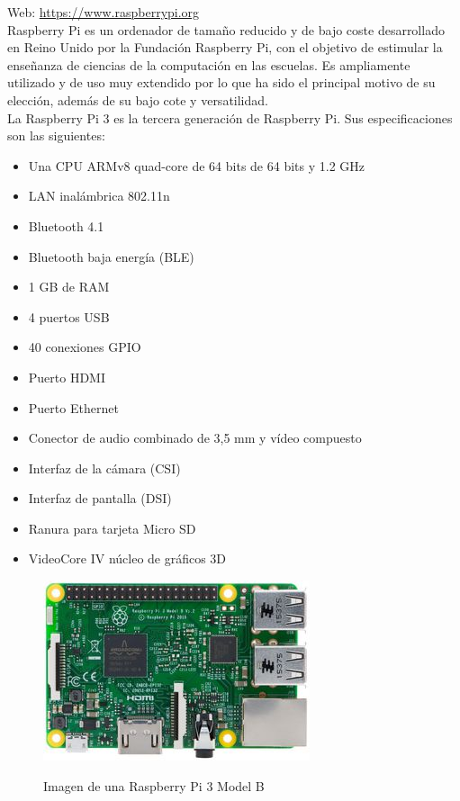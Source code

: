 Web: \url{https://www.raspberrypi.org}\\

Raspberry Pi es un ordenador de tamaño reducido y de bajo coste desarrollado en Reino Unido por la Fundación Raspberry Pi, con el objetivo de estimular la enseñanza de ciencias de la computación
en las escuelas. Es ampliamente utilizado y de uso muy extendido por lo que ha sido el principal motivo de su elección, además de su bajo cote y versatilidad.\\

La Raspberry Pi 3 es la tercera generación de Raspberry Pi. Sus especificaciones son las siguientes:

\begin{itemize}
 \item Una CPU ARMv8 quad-core de 64 bits de 64 bits y 1.2 GHz
 \item LAN inalámbrica 802.11n
 \item Bluetooth 4.1
 \item Bluetooth baja energía (BLE)
 \item 1 GB de RAM
 \item 4 puertos USB
 \item 40 conexiones GPIO
 \item Puerto HDMI
 \item Puerto Ethernet
 \item Conector de audio combinado de 3,5 mm y vídeo compuesto
 \item Interfaz de la cámara (CSI)
 \item Interfaz de pantalla (DSI)
 \item Ranura para tarjeta Micro SD
 \item VideoCore IV núcleo de gráficos 3D 
\end{itemize}


\begin{figure}[H]
  \begin{center}
    \includegraphics[scale=0.5]{imagenes/raspberry-pi.jpg}\\
    \caption{Imagen de una Raspberry Pi 3 Model B}
  \end{center}
\end{figure}


